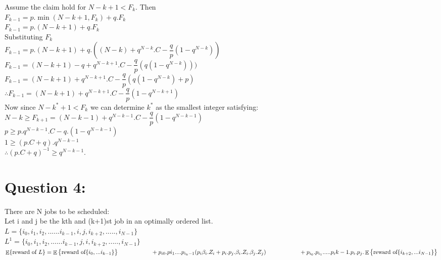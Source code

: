\documentclass{article}
\newcommand\tab[1][1cm]{\hspace*{#1}}
\begin{document}
\noindent Assume the claim hold for $N-k+1 < F_{k}$. Then\\
$F_{k-1}=p.\min(N-k+1,F_k)+q.F_k$\\
$F_{k-1}=p.(N-k+1)+q.F_k$\\
Substituting $F_k$\\
$F_{k-1}=p.(N-k+1)+q.((N-k)+q^{N-k}.C-\dfrac{q}{p}(1-q^{N-k}) )$\\
$F_{k-1}=(N-k+1)-q+q^{N-k+1}.C-\dfrac{q}{p}(q(1-q^{N-k})) )$\\
$F_{k-1}=(N-k+1)+q^{N-k+1}.C-\dfrac{q}{p}(q(1-q^{N-k})+p) $\\
$\therefore F_{k-1}=(N-k+1)+q^{N-k+1}.C-\dfrac{q}{p}(1-q^{N-k+1}) $\\

Now since $N-k^*+1<F_{k}$ we can determine $k^*$ as the smallest integer satisfying:\\
$N-k \geq F_{k+1}=(N-k-1)+q^{N-k-1}.C-\dfrac{q}{p}(1-q^{N-k-1})$\\
$p \geq p.q^{N-k-1}.C-q.(1-q^{N-k-1})$\\
$1 \geq (p.C+q).q^{N-k-1}$\\
$\therefore (p.C+q)^{-1} \geq q^{N-k-1}$.




\section{Question 4:}
There are N jobs to be scheduled:\\
Let i and j be the kth and (k+1)st job in an optimally ordered list.\\
$L=\{i_0,i_1,i_2,......i_{k-1},i,j,i_{k+2},.....,i_{N-1}\}$\\
$L^1=\{i_0,i_1,i_2,......i_{k-1},j,i,i_{k+2},.....,i_{N-1}\}$\\
$\displaystyle \mathop{\mathbb{E}}\{\textrm{reward of }L\}=\displaystyle \mathop{\mathbb{E}} \big\{ \textrm{reward of} \{  i_0,...i_{k-1}    \}  \big\} \\ \tab \tab+   p_{i0}.p{i_1}....p_{i_k-1}(p_i\beta_i.Z_i+p_i.p_j.\beta_i.Z_i.\beta_j.Z_j)\\ \tab \tab+p_{i_0}.p_{i_1}.....p_i{k-1}.p_i.p_j.\displaystyle \mathop{\mathbb{E}} \big\{ \textrm{reward of} \{  i_{k+2},...i_{N-1}    \}  \big\}$\\
\end{document}
